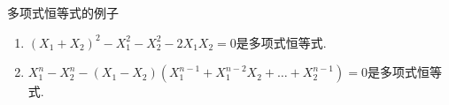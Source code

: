 \begin{example}{多项式恒等式的例子}{}
	\begin{enumerate}
		\item $\left(X_{1}+X_{2}\right)^{2}-X_{1}^{2}-X_{2}^{2}-2X_{1}X_{2}=0$是多项式恒等式.
		\item $X_{1}^{n}-X_{2}^{n}-\left(X_{1}-X_{2}\right)\left(X_{1}^{n-1}+X_{1}^{n-2}X_{2}+\ldots+X_{2}^{n-1}\right)=0$是多项式恒等式.
	\end{enumerate}
\end{example}
































































































